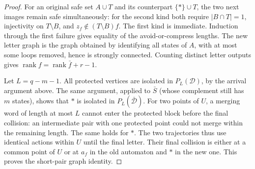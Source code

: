 \documentclass[10pt]{article}
\begin{document}
\begin{proof}
For an original safe set $A\cup T$ and its counterpart
$\{*\}\cup T$, the two next images remain safe simultaneously:
for the second kind both require $|B\cap T|=1$, injectivity
on $T\setminus B$, and $z_f\notin (T\setminus B)f$.
The first kind is immediate. Induction through the first
failure gives equality of the avoid-or-compress lengths.
The new letter graph is the graph obtained by identifying
all states of $A$, with at most some loops removed, hence is
strongly connected. Counting distinct letter outputs gives
$\operatorname{rank}f=\operatorname{rank}\bar f+r-1$.

Let $L=q-m-1$. All protected vertices are isolated in
$P_L(\mathcal D)$, by the arrival argument above.
The same argument, applied to $\bar S$ (whose complement
still has $m$ states), shows that $*$ is isolated in
$P_L(\bar{\mathcal D})$.
For two points of $U$, a merging word of length at most $L$
cannot enter the protected block before the final collision:
an intermediate pair with one protected point could not
merge within the remaining length. The same holds for $*$.
The two trajectories thus use identical actions within $U$
until the final letter. Their final collision is either at a
common point of $U$ or at $a_f$ in the old automaton and $*$
in the new one. This proves the short-pair graph identity.
\end{proof}
\end{document}
